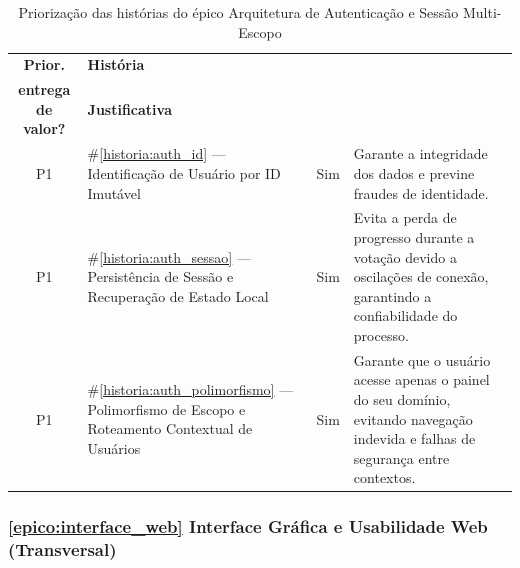 \documentclass[12pt,a4paper]{article}
\newcounter{epico}
\newcounter{historia}
\begin{document}
\begin{table}[H]
\centering
\small
\begin{tabular}{|c|m{3.4cm}|c|m{6.7cm}|}
\hline
\rowcolor[gray]{0.9}
\textbf{Prior.} &
\textbf{História} &
\makecell{\textbf{Incluído na primeira}\\
\textbf{entrega de valor?}} &
\textbf{Justificativa} \\
\hline

P1 &
\#\ref{historia:auth_id} --- Identificação de Usuário por ID Imutável &
 Sim &
 Garante a integridade dos dados e previne fraudes de identidade.
 \\

\hline
P1 &
\#\ref{historia:auth_sessao} --- Persistência de Sessão e Recuperação de Estado Local &
 Sim &
Evita a perda de progresso durante a votação devido a oscilações de conexão, garantindo a confiabilidade do processo.
 \\

\hline
P1 &
\#\ref{historia:auth_polimorfismo} --- Polimorfismo de Escopo e Roteamento Contextual de Usuários &
 Sim &
Garante que o usuário acesse apenas o painel do seu domínio, evitando navegação indevida e falhas de segurança entre contextos.
 \\

\hline

\end{tabular}
\caption{Priorização das histórias do épico Arquitetura de Autenticação e Sessão Multi-Escopo}
\end{table}

\subsubsection{\ref{epico:interface_web} Interface Gráfica e Usabilidade Web (Transversal)}
\end{document}
